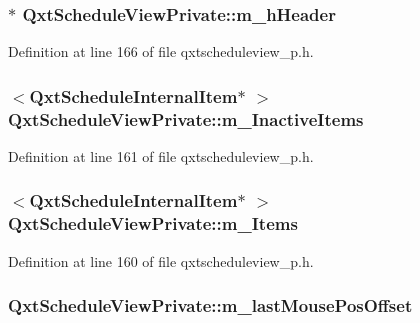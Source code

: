 \hypertarget{class_qxt_schedule_view_private_a07b5161e537aad14106e0adb296d9ae0}{
\subsubsection[{m\-\_\-h\-Header}]{$\ast$ Qxt\-Schedule\-View\-Private\-::m\-\_\-h\-Header}}\label{class_qxt_schedule_view_private_a07b5161e537aad14106e0adb296d9ae0}


Definition at line 166 of file qxtscheduleview\-\_\-p.\-h.

\hypertarget{class_qxt_schedule_view_private_a1346f58f4afdebcc45a229b726071b02}{
\subsubsection[{m\-\_\-\-Inactive\-Items}]{$<${\bf Qxt\-Schedule\-Internal\-Item}$\ast$ $>$ Qxt\-Schedule\-View\-Private\-::m\-\_\-\-Inactive\-Items}}\label{class_qxt_schedule_view_private_a1346f58f4afdebcc45a229b726071b02}


Definition at line 161 of file qxtscheduleview\-\_\-p.\-h.

\hypertarget{class_qxt_schedule_view_private_a484aa797dad1ad0499937c02f5f687fc}{
\subsubsection[{m\-\_\-\-Items}]{$<${\bf Qxt\-Schedule\-Internal\-Item}$\ast$ $>$ Qxt\-Schedule\-View\-Private\-::m\-\_\-\-Items}}\label{class_qxt_schedule_view_private_a484aa797dad1ad0499937c02f5f687fc}


Definition at line 160 of file qxtscheduleview\-\_\-p.\-h.

\hypertarget{class_qxt_schedule_view_private_a493afa216b514a23862a183a388daf74}{
\subsubsection[{m\-\_\-last\-Mouse\-Pos\-Offset}]{ Qxt\-Schedule\-View\-Private\-::m\-\_\-last\-Mouse\-Pos\-Offset}}\label{class_qxt_schedule_view_private_a493afa216b514a23862a183a388daf74}


